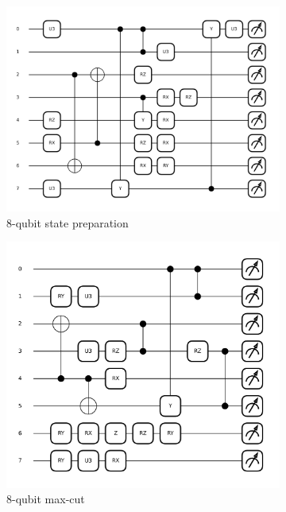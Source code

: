 \documentclass{article} %
\begin{document}
\begin{figure}[ht]
\begin{center}
    \begin{subfigure}[b]{0.275\textwidth}
    \centering
    \includegraphics[width=\textwidth, height=0.75\textwidth]{images/best_candidate/8-qubits-fidelity_best_candidate_2930.png}
    \caption{8-qubit state preparation}
    \end{subfigure}
    \hfill
    \begin{subfigure}[b]{0.275\textwidth}
    \centering
    \includegraphics[width=\textwidth,  height=0.75\textwidth]{images/best_candidate/8-qubits-maxcut_best_candidate_84948.png}
    \caption{8-qubit max-cut}
    \end{subfigure}
    \hfill
    \begin{subfigure}[b]{0.275\textwidth}

\end{subfigure}
\end{center}
\end{figure}
\end{document}
